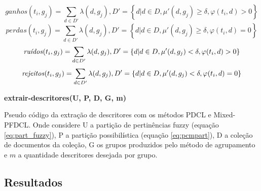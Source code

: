 \begin{equation}
  ganhos(t_i,g_j) = 
  \sum_{
      d \in D' 
  } \lambda(d,g_j), D' = \left\{d | d \in D, \mu'(d,g_j) \geq \delta, \varphi(t_i,d) > 0
  \right\}
  \label{eq:ganhos2}
\end{equation}
\begin{equation}
  perdas(t_i,g_j) = 
  \sum_{
      d \in D' 
  } \lambda(d,g_j), D' = \left\{d | d \in D, \mu'(d,g_j) \geq \delta, \varphi(t_i,d) = 0
  \right\}
  \label{eq:perdas2}
\end{equation}
\begin{equation}
  \text{\it ruídos\/}(t_i,g_j) = 
  \sum_{
      d \in D' 
  } \lambda(d,g_j), D' = \left\{d | d \in D, \mu'(d,g_j) < \delta, \varphi(t_i,d) > 0 \right\}
  \label{eq:ruidos2}
\end{equation}
\begin{equation}
  \text{\it rejeitos\/}(t_i,g_j) = 
  \sum_{
      d \in D' 
  } \lambda(d,g_j), D' = \left\{d | d \in D, \mu'(d,g_j) < \delta, \varphi(t_i,d) = 0 \right\}
  \label{eq:rejeitos2}
\end{equation}

\begin{algorithm}[H] 
  \SetAlgoLined 
  \textbf{{\color{blue}extrair-descritores}(U, P, D, G, m)}\\
  \caption{Pseudo código da extração de descritores com os métodos PDCL e Mixed-PFDCL. Onde
    considere U a
  partição de pertinências fuzzy (equação \ref{eq:part_fuzzy}), P a partição
  possibilística (equação \ref{eq:pcmpart}), D a coleção de documentos da coleção, G os grupos
produzidos pelo método de agrupamento e $m$ a quantidade descritores desejada por grupo.}
\label{alg:pdcl} 
\end{algorithm}

\subsection{Resultados}

